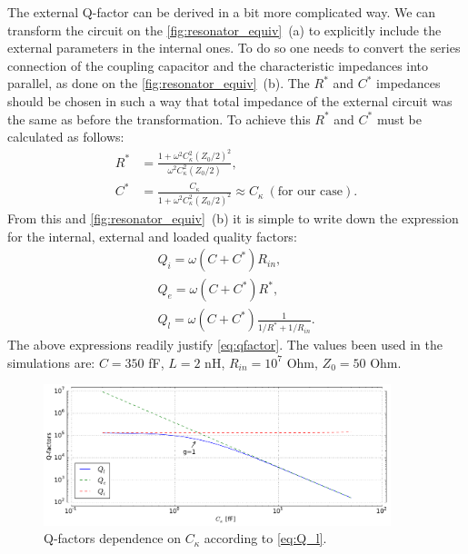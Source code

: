 \documentclass[12pt]{report}
\numberwithin{equation}{section}
\begin{document}
The external Q-factor can be derived in a bit more complicated way\cite{Goppl2008}. We can transform the circuit on the \autoref{fig:resonator_equiv}~(a) to explicitly include the external parameters in the internal ones. To do so one needs to convert the series connection of the coupling capacitor and the characteristic impedances into parallel, as done on the \autoref{fig:resonator_equiv}~(b). The $R^*$ and $C^*$ impedances should be chosen in such a way that total impedance of the external circuit was the same as before the transformation. To achieve this $R^*$ and $C^*$ must be calculated as follows:
\begin{align}
R^{*} &= \frac{1+\omega^2 C_\kappa^2 (Z_0/2)^2}{\omega^2 C_\kappa^2 (Z_0/2)	}, \\
C^{*} &= \frac{C_\kappa}{1+\omega^2 C_\kappa^2 (Z_0/2)^2} \approx C_\kappa\ (\text{for our case}). \label{eq:C_ast}
\end{align}
From this and \autoref{fig:resonator_equiv}~(b) it is simple to write down the expression for the internal, external and loaded quality factors:
\begin{gather}
Q_i =  \omega (C+C^{*}) R_{in}, \\
Q_e = \omega (C+C^{*}) R^{*}, \\
Q_l = \omega (C+C^{*})  \frac{1}{1/R^{*}+1/R_{in}}. \label{eq:Q_l}
\end{gather}
The above expressions readily justify \eqref{eq:qfactor}. The values been used in the simulations are: $C = 350$ fF, $L = 2$ nH, $R_{in}=10^7$ Ohm, $Z_0 = 50$ Ohm. 


\begin{figure}
\centering
\includegraphics[width=0.9\textwidth]{q-factors}
\caption{Q-factors dependence on $C_\kappa$ according to \eqref{eq:Q_l}.}
\end{figure}
\end{document}
